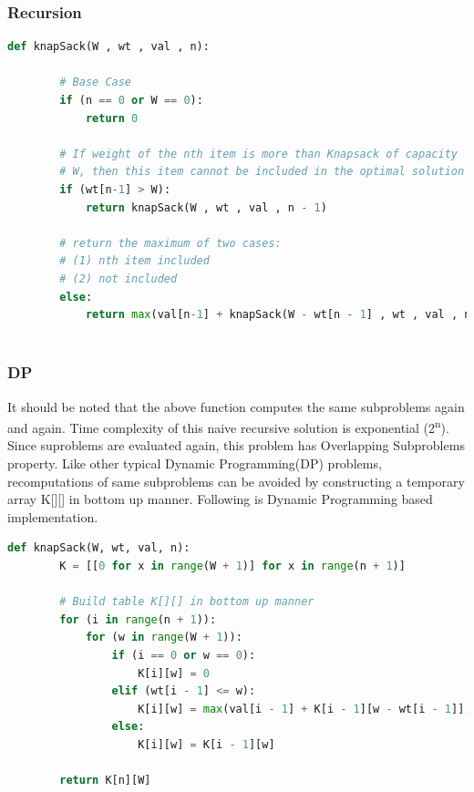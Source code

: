\documentclass[12pt]{article}
\begin{document}
	\subsubsection{Recursion}
	\begin{lstlisting}[language=Python]
	def knapSack(W , wt , val , n): 
  
        # Base Case 
        if (n == 0 or W == 0): 
            return 0
      
        # If weight of the nth item is more than Knapsack of capacity 
        # W, then this item cannot be included in the optimal solution 
        if (wt[n-1] > W): 
            return knapSack(W , wt , val , n - 1) 
      
        # return the maximum of two cases: 
        # (1) nth item included 
        # (2) not included 
        else: 
            return max(val[n-1] + knapSack(W - wt[n - 1] , wt , val , n - 1), knapSack(W , wt , val , n - 1)) 
        
    \end{lstlisting}
	\subsubsection{DP}
    It should be noted that the above function computes the same subproblems again and again. Time complexity of this naive recursive solution is exponential (2\textsuperscript{n}).\\
    Since suproblems are evaluated again, this problem has Overlapping Subproblems property. Like other typical Dynamic Programming(DP) problems, recomputations of same subproblems can be avoided by constructing a temporary array K[][] in bottom up manner. Following is Dynamic Programming based implementation. 
	
	\begin{lstlisting}[language=Python]
	def knapSack(W, wt, val, n): 
        K = [[0 for x in range(W + 1)] for x in range(n + 1)] 
      
        # Build table K[][] in bottom up manner 
        for (i in range(n + 1)): 
            for (w in range(W + 1)): 
                if (i == 0 or w == 0): 
                    K[i][w] = 0
                elif (wt[i - 1] <= w): 
                    K[i][w] = max(val[i - 1] + K[i - 1][w - wt[i - 1]], K[i - 1][w]) 
                else: 
                    K[i][w] = K[i - 1][w] 
      
        return K[n][W] 
        
    \end{lstlisting}
    \newpage
\end{document}

